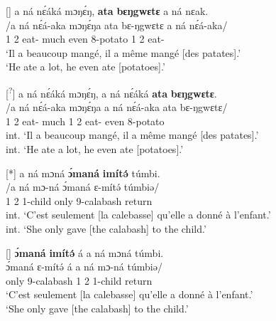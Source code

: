 \documentclass[output=paper,colorlinks,citecolor=brown
]{langscibook}
\begin{document}
\ex
[]{
\label{eveneatpotatoexsitu}
\glll
{\db}a ná nɛ́áká mɔŋɛ́ŋ, \textbf{ata} \textbf{bɛŋgwɛtɛ} a ná nɛak. \\
/a ná nɛ́á-aka mɔŋɛ́ŋa ata bɛ-ŋgwɛtɛ a ná nɛ́á-aka/ \\
{\db}1\SM{} \PST{}2{} eat-\DUR{} much  even 8-potato  1\SM{} \PST{}2{} eat-\DUR{} \\
\glt
`Il a beaucoup mangé, il a même mangé [des patates]\textsubscript{\FOC{}}.' \\ `He ate a lot, he even ate [potatoes]\textsubscript{\FOC{}}.' \jambox*{[PM (+DM) 2264] }
}

\ex
[\textsuperscript{?}]{
\label{eveneatpotatoright}
\glll
{\db}a ná nɛ́áká mɔŋɛ́ŋ, a ná nɛ́áká \textbf{ata} \textbf{bɛŋgwɛtɛ}. \\
/a ná nɛ́á-aka mɔŋɛ́ŋa a ná nɛ́á-aka ata bɛ-ŋgwɛtɛ/ \\
{\db}1\SM{} \PST{}2{} eat-\DUR{} much   1\SM{} \PST{}2{} eat-\DUR{} even 8-potato \\
\glt
int. `Il a beaucoup mangé, il a même mangé [des patates]\textsubscript{\FOC{}}.' \\ int. `He ate a lot, he even ate [potatoes]\textsubscript{\FOC{}}.' \jambox*{[PM (+DM) 2263] }
}

\z
\z

\ea \label{onlyset1}
\ea
[*]{
\label{onlyset1.a}
\glll
{\db}a ná mɔná \textbf{ɔ́maná} \textbf{imítə́} túmbi. \\
/a ná mɔ-ná ɔ́maná ɛ-mítə́ túmbiə/ \\
{\db}1\SM{} \PST{}2{} 1-child only 9-calabash return \\
\glt
int. `C'est seulement [la calebasse]\textsubscript{\FOC{}} qu'elle a donné à l'enfant.' \\ int. `She only gave [the calabash]\textsubscript{\FOC{}} to the child.' \jambox*{[JO 1593] }
}

\ex
[]{
\label{onlyset1.b}
\glll
{\db}\textbf{ɔ́maná} \textbf{imítə́} á a ná mɔná túmbi. \\
ɔ́maná ɛ-mítə́ á a ná mɔ-ná túmbiə/ \\
{\db}only 9-calabash \COP{} 1\SM{} \PST{}2{} 1-child return \\
\glt
`C'est seulement [la calebasse]\textsubscript{\FOC{}} qu'elle a donné à l'enfant.' \\ `She only gave [the calabash]\textsubscript{\FOC{}} to the child.' \jambox*{[JO 1592] }
}
\end{document}
